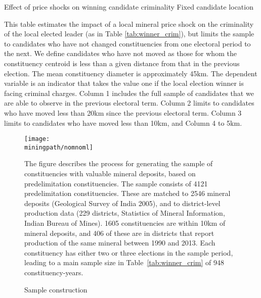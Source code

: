 \newpage
\begin{table}[H]\caption{Effect of price shocks on winning candidate
    criminality \cnewline Fixed candidate location}
  \label{tab:app_fixed_loc}
  \newcommand{\tablenote}{}
  
\end{table}
\begin{adjustwidth}{2cm}{2cm}
  \footnotesize{This table estimates the impact of a local mineral
    price shock on the criminality of the local elected leader (as in
    Table \ref{tab:winner_crim}), but limits the sample to candidates
    who have not changed constituencies from one electoral period to
    the next. We define candidates who have not moved as those for
    whom the constituency centroid is less than a given distance from
    that in the previous election. The mean constituency diameter is
    approximately 45km.   The dependent variable is
    an indicator that takes the value one if the local election winner
    is facing criminal charges. Column 1 includes the full sample of
    candidates that we are able to observe in the previous electoral
    term. Column 2 limits to candidates who have moved less than 20km
    since the previous electoral term. Column 3 limits to candidates
    who have moved less than 10km, and Column 4 to 5km.  }
\end{adjustwidth}

\newpage
\begin{figure}[H]\caption{Sample construction}
  \begin{center}
    \texttt{[image: \\miningpath/nomnoml]}
    \label{fig:app_sample}
  \end{center}
  \footnotesize{The figure describes the process for generating the
    sample of constituencies with valuable mineral deposits, based on
    predelimitation constituencies. The sample consists of 4121
    predelimitation constituencies. These are matched to 2546 mineral
    deposits (Geological Survey of India 2005), and to district-level
    production data (229 districts, Statistics of Mineral Information,
    Indian Bureau of Mines). 1605 constituencies are within 10km of
    mineral deposits, and 406 of these are in districts that report
    production of the same mineral between 1990 and 2013. Each
    constituency has either two or three elections in the sample
    period, leading to a main sample size in
    Table~\ref{tab:winner_crim} of 948 constituency-years.}
\end{figure}  


